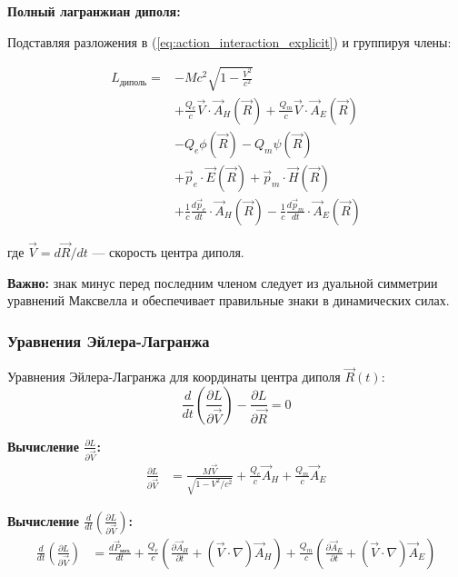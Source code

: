 \documentclass[a4paper,12pt]{article}
\begin{document}
\textbf{Полный лагранжиан диполя:}

Подставляя разложения в (\ref{eq:action_interaction_explicit}) и группируя члены:

\begin{equation}
\boxed{
\begin{aligned}
L_{\text{диполь}} = & -Mc^2\sqrt{1 - \frac{V^2}{c^2}} \\
& + \frac{Q_e}{c}\vec{V}\cdot\vec{A}_H(\vec{R}) + \frac{Q_m}{c}\vec{V}\cdot\vec{A}_E(\vec{R}) \\
& - Q_e\phi(\vec{R}) - Q_m\psi(\vec{R}) \\
& + \vec{p}_e\cdot\vec{E}(\vec{R}) + \vec{p}_m\cdot\vec{H}(\vec{R}) \\
& + \frac{1}{c}\frac{d\vec{p}_e}{dt}\cdot\vec{A}_H(\vec{R}) - \frac{1}{c}\frac{d\vec{p}_m}{dt}\cdot\vec{A}_E(\vec{R})
\end{aligned}
}
\label{eq:dipole_lagrangian_full}
\end{equation}

где $\vec{V} = d\vec{R}/dt$ --- скорость центра диполя.

\textbf{Важно:} знак минус перед последним членом следует из дуальной симметрии уравнений Максвелла и обеспечивает правильные знаки в динамических силах.

\subsubsection{Уравнения Эйлера-Лагранжа}

Уравнения Эйлера-Лагранжа для координаты центра диполя $\vec{R}(t)$:
\begin{equation}
\frac{d}{dt}\left(\frac{\partial L}{\partial \vec{V}}\right) - \frac{\partial L}{\partial \vec{R}} = 0
\label{eq:euler_lagrange}
\end{equation}

\textbf{Вычисление $\frac{\partial L}{\partial \vec{V}}$:}
\begin{align}
\frac{\partial L}{\partial \vec{V}} &= \frac{M\vec{V}}{\sqrt{1 - V^2/c^2}} + \frac{Q_e}{c}\vec{A}_H + \frac{Q_m}{c}\vec{A}_E
\label{eq:dL_dV}
\end{align}

\textbf{Вычисление $\frac{d}{dt}\left(\frac{\partial L}{\partial \vec{V}}\right)$:}
\begin{align}
\frac{d}{dt}\left(\frac{\partial L}{\partial \vec{V}}\right) &= \frac{d\vec{P}_{\text{мех}}}{dt} + \frac{Q_e}{c}\left(\frac{\partial\vec{A}_H}{\partial t} + (\vec{V}\cdot\nabla)\vec{A}_H\right) + \frac{Q_m}{c}\left(\frac{\partial\vec{A}_E}{\partial t} + (\vec{V}\cdot\nabla)\vec{A}_E\right)
\label{eq:d_dL_dV}
\end{align}
\end{document}
